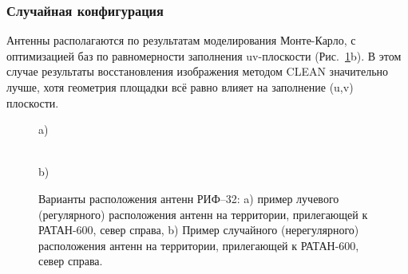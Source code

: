 \documentclass[10pt,a4paper]{article}
\begin{document}
\subsubsection{Случайная конфигурация}
Антенны располагаются по результатам моделирования Монте-Карло, с оптимизацией баз по равномерности заполнения uv-плоскости (Рис.~\ref{fig:RIF32-config}b). В этом случае результаты восстановления изображения методом CLEAN значительно лучше, хотя геометрия площадки всё равно влияет на заполнение (u,v) плоскости.

\begin{figure} %
\begin{minipage}[h]{1\linewidth}
 a) \\
\end{minipage}
\vfill
\begin{minipage}[h]{1\linewidth}
 \\b)
\end{minipage}
\caption{Варианты расположения антенн РИФ--32: a) пример лучевого (регулярного) расположения антенн на территории, прилегающей к РАТАН-600, север справа, b) Пример случайного (нерегулярного) расположения антенн на территории, прилегающей к РАТАН-600, север справа.}
\label{fig:RIF32-config}
\end{figure}
\end{document}
